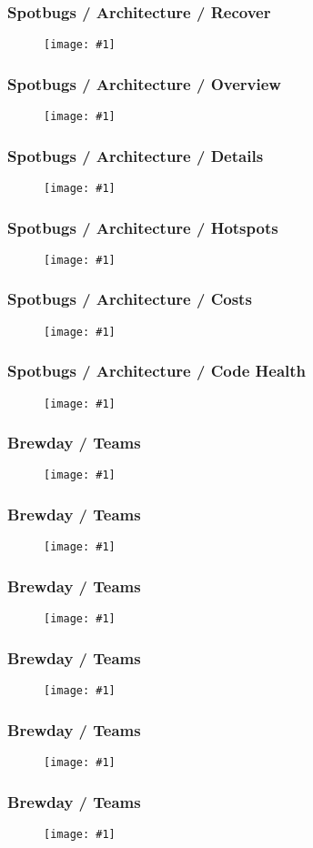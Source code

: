 \documentclass{beamer}
\newcommand{\putimage}[2] {
\begin{figure}[H]
  \centering
  \texttt{[image: \#1]}
\end{figure}
}
\begin{document}
\begin{frame}
  \frametitle{Spotbugs / Architecture / Recover}
  \putimage{img/spotbugs-architecture-3.png}{0.99}
\end{frame}

\begin{frame}
  \frametitle{Spotbugs / Architecture / Overview}
  \putimage{img/spotbugs-architecture-4.png}{0.99}
\end{frame}

\begin{frame}
  \frametitle{Spotbugs / Architecture / Details}
  \putimage{img/spotbugs-architecture-5.png}{0.99}
\end{frame}

\begin{frame}
  \frametitle{Spotbugs / Architecture / Hotspots}
  \putimage{img/spotbugs-architecture-6.png}{0.99}
\end{frame}

\begin{frame}
  \frametitle{Spotbugs / Architecture / Costs}
  \putimage{img/spotbugs-architecture-7.png}{0.99}
\end{frame}

\begin{frame}
  \frametitle{Spotbugs / Architecture / Code Health}
  \putimage{img/spotbugs-architecture-8.png}{0.99}
\end{frame}

\begin{frame}
  \frametitle{Brewday / Teams}
  \putimage{img/brewday-teams-1.png}{0.99}
\end{frame}

\begin{frame}
  \frametitle{Brewday / Teams}
  \putimage{img/brewday-teams-2.png}{0.99}
\end{frame}

\begin{frame}
  \frametitle{Brewday / Teams}
  \putimage{img/brewday-teams-3.png}{0.99}
\end{frame}

\begin{frame}
  \frametitle{Brewday / Teams}
  \putimage{img/brewday-teams-4.png}{0.99}
\end{frame}

\begin{frame}
  \frametitle{Brewday / Teams}
  \putimage{img/brewday-teams-5.png}{0.99}
\end{frame}

\begin{frame}
  \frametitle{Brewday / Teams}
  \putimage{img/brewday-teams-6.png}{0.99}
\end{frame}
\end{document}
